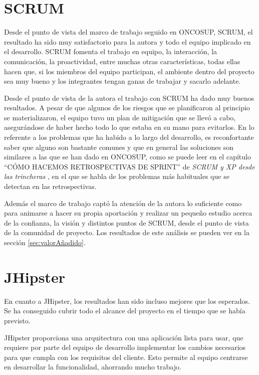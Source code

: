 \section{SCRUM}
\label{sec:conclusionesScrum}

Desde el punto de vista del marco de trabajo seguido en ONCOSUP, SCRUM, el resultado ha sido muy satisfactorio para la autora y todo el equipo implicado en el desarrollo. SCRUM fomenta el trabajo en equipo, la interacción, la comunicación, la proactividad, entre muchas otras características, todas ellas hacen que, si los miembros del equipo participan, el ambiente dentro del proyecto sea muy bueno y los integrantes tengan ganas de trabajar y sacarlo adelante.

Desde el punto de vista de la autora el trabajo con SCRUM ha dado muy buenos resultados. A pesar de que algunos de los riesgos que se planificaron al principio se materializaron, el equipo tuvo un plan de mitigación que se llevó a cabo, asegurándose de haber hecho todo lo que estaba en su mano para evitarlos. En lo referente a los problemas que ha habido a lo largo del desarrollo, es reconfortante saber que alguno son bastante comunes y que en general las soluciones son similares a las que se han dado en ONCOSUP, como se puede leer en el capítulo ``CÓMO HACEMOS RETROSPECTIVAS DE SPRINT'' de \emph{SCRUM y XP desde las trincheras} \cite{scrumXP}, en el que se habla de los problemas más habituales que se detectan en las retrospectivas.

Además el marco de trabajo captó la atención de la autora lo suficiente como para animarse a hacer su propia aportación y realizar un pequeño estudio acerca de la confianza, la visión y distintos puntos de SCRUM, desde el punto de vista de la comunidad de proyecto. Los resultados de este análisis se pueden ver en la sección \ref{sec:valorAñadido}.

\section{JHipster}
\label{sec:conclusionesJhipster}

En cuanto a JHipster, los resultados han sido incluso mejores que los esperados. Se ha conseguido cubrir todo el alcance del proyecto en el tiempo que se había previsto. 

JHipster proporciona una arquitectura con una aplicación lista para usar, que requiere por parte del equipo de desarrollo implementar los cambios necesarios para que cumpla con los requisitos del cliente. Esto permite al equipo centrarse en desarrollar la funcionalidad, ahorrando mucho trabajo. 

